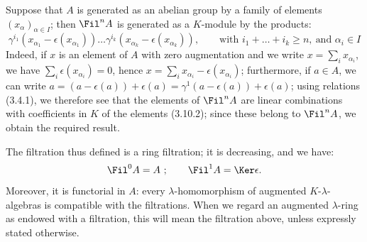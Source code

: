Suppose that \(A\) is generated as an abelian group by a family of elements \((x_\alpha)_{\alpha\in I}\); then \(\Fil^n A\) is generated as a \(K\)-module by the products:
\begin{equation}\tag{3.10.2}
  \gamma^{i_1}(x_{\alpha_1}-\epsilon(x_{\alpha_1}))\ldots
  \gamma^{i_k}(x_{\alpha_k}-\epsilon(x_{\alpha_k})),
  \qquad \text{with } i_1+\ldots+i_k\ge n,\ \text{and } \alpha_i\in I
\end{equation}
Indeed, if \(x\) is an element of \(A\) with zero augmentation and we write \(x=\sum_i x_{\alpha_i}\), we have \(\sum_i \epsilon(x_{\alpha_i})=0\), hence \(x=\sum_i x_{\alpha_i}-\epsilon(x_{\alpha_i})\); furthermore, if \(a\in A\), we can write \(a=(a-\epsilon(a))+\epsilon(a)=\gamma^1(a-\epsilon(a))+\epsilon(a)\); using relations (3.4.1), we therefore see that the elements of \(\Fil^n A\) are linear combinations with coefficients in \(K\) of the elements (3.10.2); since these belong to \(\Fil^n A\), we obtain the required result.

The filtration thus defined is a ring filtration; it is decreasing, and we have:
\[
  \Fil^0A=A~;
  \qquad \Fil^1A=\Ker\epsilon.
\]
Moreover, it is functorial in \(A\): every \(\lambda\)-homomorphism of augmented \(K\)-\(\lambda\)-algebras is compatible with the filtrations. When we regard an augmented \(\lambda\)-ring as endowed with a filtration, this will mean the filtration above, unless expressly stated otherwise.

